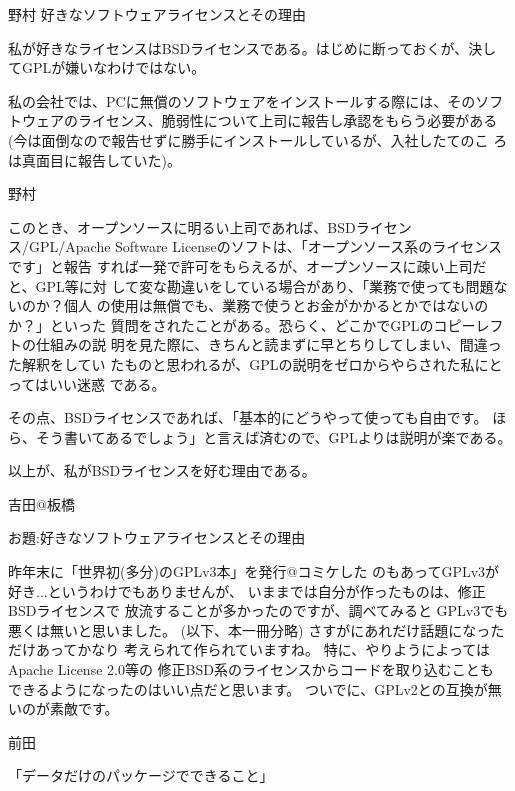 \documentclass[cjk,dvipdfmx,12pt]{beamer}
\begin{document}
\begin{frame}{野村}
好きなソフトウェアライセンスとその理由

私が好きなライセンスはBSDライセンスである。はじめに断っておくが、決し
てGPLが嫌いなわけではない。

私の会社では、PCに無償のソフトウェアをインストールする際には、そのソフ
トウェアのライセンス、脆弱性について上司に報告し承認をもらう必要がある
(今は面倒なので報告せずに勝手にインストールしているが、入社したてのこ
ろは真面目に報告していた)。

\end{frame}\begin{frame}{野村}

このとき、オープンソースに明るい上司であれば、BSDライセンス/GPL/Apache
Software Licenseのソフトは、「オープンソース系のライセンスです」と報告
すれば一発で許可をもらえるが、オープンソースに疎い上司だと、GPL等に対
して変な勘違いをしている場合があり、「業務で使っても問題ないのか？個人
の使用は無償でも、業務で使うとお金がかかるとかではないのか？」といった
質問をされたことがある。恐らく、どこかでGPLのコピーレフトの仕組みの説
明を見た際に、きちんと読まずに早とちりしてしまい、間違った解釈をしてい
たものと思われるが、GPLの説明をゼロからやらされた私にとってはいい迷惑
である。

その点、BSDライセンスであれば、「基本的にどうやって使っても自由です。
ほら、そう書いてあるでしょう」と言えば済むので、GPLよりは説明が楽である。

以上が、私がBSDライセンスを好む理由である。

\end{frame}\begin{frame}{吉田@板橋}


お題:好きなソフトウェアライセンスとその理由

昨年末に「世界初(多分)のGPLv3本」を発行@コミケした
のもあってGPLv3が好き...というわけでもありませんが、
いままでは自分が作ったものは、修正BSDライセンスで
放流することが多かったのですが、調べてみると
GPLv3でも悪くは無いと思いました。
(以下、本一冊分略)
さすがにあれだけ話題になっただけあってかなり
考えられて作られていますね。
特に、やりようによってはApache License 2.0等の
修正BSD系のライセンスからコードを取り込むことも
できるようになったのはいい点だと思います。
ついでに、GPLv2との互換が無いのが素敵です。

\end{frame}\begin{frame}{前田}



「データだけのパッケージでできること」


\end{frame}
\end{document}
